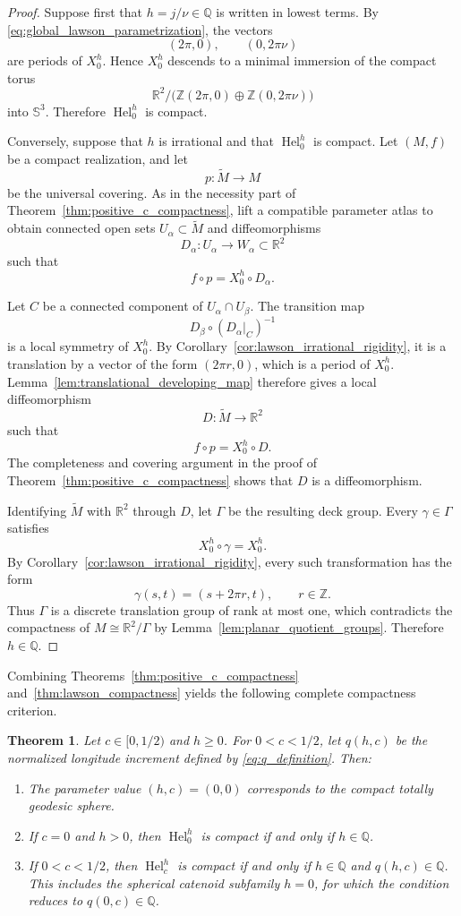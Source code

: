 \documentclass[a4paper,11pt]{amsart}
\numberwithin{equation}{section}
\theoremstyle{plain}
\newtheorem{thm}{Theorem}[section]
\begin{document}
\begin{proof}
Suppose first that $h=j/\nu\in\mathbb Q$ is written in lowest
terms. By
\eqref{eq:global_lawson_parametrization}, the vectors
\[
(2\pi,0),
\qquad
(0,2\pi\nu)
\]
are periods of $X_0^h$. Hence $X_0^h$ descends to a minimal immersion
of the compact torus
\[
\mathbb R^2/
\bigl(
\mathbb Z(2\pi,0)
\oplus
\mathbb Z(0,2\pi\nu)
\bigr)
\]
into $\mathbb S^3$. Therefore $\operatorname{Hel}_0^h$ is compact.

Conversely, suppose that $h$ is irrational and that
$\operatorname{Hel}_0^h$ is compact. Let $(M,f)$ be a compact realization, and let
\[
p:\widetilde M\longrightarrow M
\]
be the universal covering. As in the necessity part of
Theorem~\ref{thm:positive_c_compactness}, lift a compatible parameter
atlas to obtain connected open sets $U_\alpha\subset\widetilde M$ and
diffeomorphisms
\[
D_\alpha:U_\alpha\longrightarrow W_\alpha\subset\mathbb R^2
\]
such that
\[
f\circ p=X_0^h\circ D_\alpha.
\]

Let $C$ be a connected component of $U_\alpha\cap U_\beta$. The
transition map
\[
D_\beta\circ(D_\alpha|_C)^{-1}
\]
is a local symmetry of $X_0^h$. By
Corollary~\ref{cor:lawson_irrational_rigidity}, it is a translation by
a vector of the form $(2\pi r,0)$, which is a period of $X_0^h$.
Lemma~\ref{lem:translational_developing_map} therefore gives a local
diffeomorphism
\[
D:\widetilde M\longrightarrow\mathbb R^2
\]
such that
\[
f\circ p=X_0^h\circ D.
\]
The completeness and covering argument in the proof of
Theorem~\ref{thm:positive_c_compactness} shows that $D$ is a
diffeomorphism.

Identifying $\widetilde M$ with $\mathbb R^2$ through $D$, let
$\Gamma$ be the resulting deck group. Every $\gamma\in\Gamma$ satisfies
\[
X_0^h\circ\gamma=X_0^h.
\]
By Corollary~\ref{cor:lawson_irrational_rigidity}, every such
transformation has the form
\[
\gamma(s,t)=(s+2\pi r,t),
\qquad
r\in\mathbb Z.
\]
Thus $\Gamma$ is a discrete translation group of rank at most one,
which contradicts the compactness of $M\cong\mathbb R^2/\Gamma$ by
Lemma~\ref{lem:planar_quotient_groups}.
Therefore $h\in\mathbb Q$.
\end{proof}

Combining Theorems~\ref{thm:positive_c_compactness}
and~\ref{thm:lawson_compactness} yields the following complete
compactness criterion.
\begin{thm}\label{thm:compactness}
Let $c\in[0,1/2)$ and $h\geq0$. For $0<c<1/2$, let $q(h,c)$ be the
normalized longitude increment defined by \eqref{eq:q_definition}.
Then:
\begin{enumerate}
\item The parameter value $(h,c)=(0,0)$ corresponds to the compact totally
geodesic sphere.
\item If $c=0$ and $h>0$, then $\operatorname{Hel}_0^h$ is compact if and only if $h\in\mathbb Q$.
\item If $0<c<1/2$, then $\operatorname{Hel}_c^h$ is compact if and only if
$h\in\mathbb Q$ and $q(h,c)\in\mathbb Q$.
This includes the spherical catenoid subfamily $h=0$, for which the
condition reduces to $q(0,c)\in\mathbb Q$.
\end{enumerate}
\end{thm}
\end{document}
